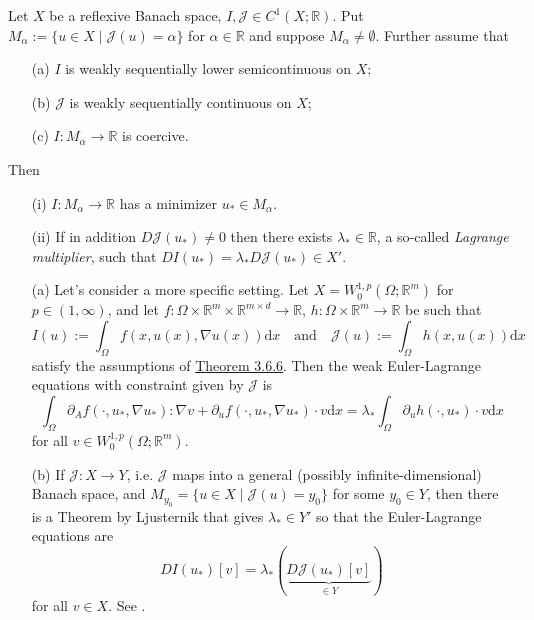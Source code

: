 \begin{theorem}
Let $X$ be a reflexive Banach space, $I,\mathcal{J}\in C^1(X;\mathbb{R})$. Put $M_\alpha:=\{u\in X\mid\mathcal{J}(u)=\alpha\}$ for $\alpha\in\mathbb{R}$ and suppose $M_\alpha\ne\emptyset$. Further assume that
\begin{itemize}
	\item[(a)] $I$ is weakly sequentially lower semicontinuous on $X$;
	\item[(b)] $\mathcal{J}$ is weakly sequentially continuous on $X$;
	\item[(c)] $I:M_\alpha\longrightarrow\mathbb{R}$ is coercive.
\end{itemize}
Then
\begin{itemize}
	\item[(i)] $I:M_\alpha\longrightarrow\mathbb{R}$ has a minimizer $u_*\in M_\alpha$.
	\item[(ii)] If in addition $D\mathcal{J}(u_*)\ne0$ then there exists $\lambda_*\in\mathbb{R}$, a so-called \textit{Lagrange multiplier}, such that $DI(u_*)=\lambda_*D\mathcal{J}(u_*)\in X'$.\\
\end{itemize}
\end{theorem}

\begin{remark}
\begin{itemize}
	\item[(a)] Let's consider a more specific setting. Let $X=W_0^{1,p}(\Omega;\mathbb{R}^m)$ for $p\in(1,\infty)$, and let $f:\Omega\times\mathbb{R}^m\times\mathbb{R}^{m\times d}\longrightarrow\mathbb{R}$, $h:\Omega\times\mathbb{R}^m\longrightarrow\mathbb{R}$ be such that
	\[I(u):=\int_\Omega{f(x,u(x),\nabla u(x))\mathrm{d}x}\quad\text{and}\quad\mathcal{J}(u):=\int_\Omega{h(x,u(x))\mathrm{d}x}\]
	satisfy the assumptions of \hyperlink{theorem_3_6_6}{Theorem 3.6.6}. Then the weak Euler-Lagrange equations with constraint given by $\mathcal{J}$ is
	\[\int_\Omega{\partial_Af(\cdot,u_*,\nabla u_*):\nabla v+\partial_uf(\cdot,u_*,\nabla u_*)\cdot v\mathrm{d}x}=\lambda_*\int_\Omega{\partial_uh(\cdot,u_*)\cdot v\mathrm{d}x}\]
	for all $v\in W_0^{1,p}(\Omega;\mathbb{R}^m)$.
	\item[(b)] If $\mathcal{J}:X\longrightarrow Y$, i.e. $\mathcal{J}$ maps into a general (possibly infinite-dimensional) Banach space, and $M_{y_0}=\{u\in X\mid\mathcal{J}(u)=y_0\}$ for some $y_0\in Y$, then there is a Theorem by Ljusternik that gives $\lambda_*\in Y'$ so that the Euler-Lagrange equations are
	\[DI(u_*)[v]=\lambda_*(\underbrace{D\mathcal{J}(u_*)[v]}_{\in Y})\]
	for all $v\in X$. See \cite[Chapter 4, 4.2 Ljusternik's Theorems]{blanchard_bruening}.\\
\end{itemize}
\end{remark}

